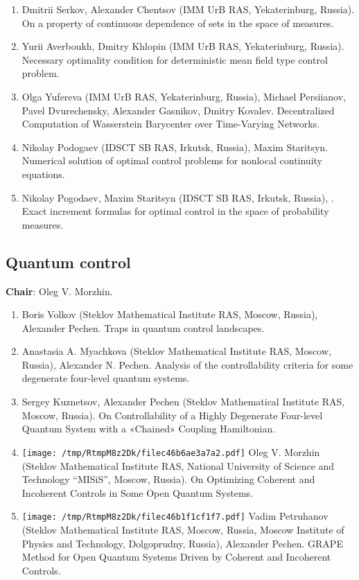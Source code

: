 \documentclass[
]{article}
\providecommand{\tightlist}{%
  \setlength{\itemsep}{0pt}\setlength{\parskip}{0pt}}
\begin{document}
\begin{enumerate}
\def\labelenumi{\arabic{enumi}.}
\tightlist
\item
  Dmitrii Serkov, Alexander Chentsov (IMM UrB RAS, Yekaterinburg,
  Russia). On a property of continuous dependence of sets in the space
  of measures.
\item
  Yurii Averboukh, Dmitry Khlopin (IMM UrB RAS, Yekaterinburg, Russia).
  Necessary optimality condition for deterministic mean field type
  control problem.
\item
  Olga Yufereva (IMM UrB RAS, Yekaterinburg, Russia), Michael
  Persiianov, Pavel Dvurechensky, Alexander Gasnikov, Dmitry Kovalev.
  Decentralized Computation of Wasserstein Barycenter over Time-Varying
  Networks.
\item
  Nikolay Podogaev (IDSCT SB RAS, Irkutsk, Russia), Maxim Staritsyn.
  Numerical solution of optimal control problems for nonlocal continuity
  equations.
\item
  Nikolay Pogodaev, Maxim Staritsyn (IDSCT SB RAS, Irkutsk, Russia),
  . Exact increment formulas
  for optimal control in the space of probability measures.
\end{enumerate}

\hypertarget{qc}{%
\subsection{Quantum control}\label{qc}}

\textbf{Chair}: Oleg V. Morzhin.

\begin{enumerate}
\def\labelenumi{\arabic{enumi}.}
\tightlist
\item
  Boris Volkov (Steklov Mathematical Institute RAS, Moscow, Russia),
  Alexander Pechen. Traps in quantum control landscapes.
\item
  Anastasia A. Myachkova (Steklov Mathematical Institute RAS, Moscow,
  Russia), Alexander N. Pechen. Analysis of the controllability criteria
  for some degenerate four-level quantum systems.
\item
  Sergey Kuznetsov, Alexander Pechen (Steklov Mathematical Institute
  RAS, Moscow, Russia). On Controllability of a Highly Degenerate
  Four-level Quantum System with a «Chained» Coupling Hamiltonian.
\item
  \protect\texttt{[image: /tmp/RtmpM8z2Dk/filec46b6ae3a7a2.pdf]}
  Oleg V. Morzhin (Steklov Mathematical Institute RAS, National
  University of Science and Technology ``MISiS'', Moscow, Russia). On
  Optimizing Coherent and Incoherent Controls in Some Open Quantum
  Systems.
\item
  \protect\texttt{[image: /tmp/RtmpM8z2Dk/filec46b1f1cf1f7.pdf]}
  Vadim Petruhanov (Steklov Mathematical Institute RAS, Moscow, Russia,
  Moscow Institute of Physics and Technology, Dolgoprudny, Russia),
  Alexander Pechen. GRAPE Method for Open Quantum Systems Driven by
  Coherent and Incoherent Controls.
\end{enumerate}
\end{document}
